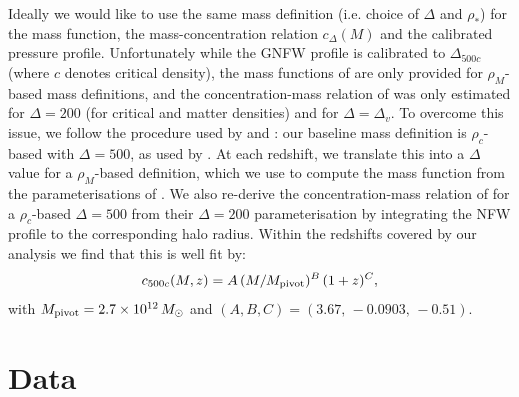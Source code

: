 \documentclass[useAMS,usenatbib]{mn2e}
\begin{document}
      Ideally we would like to use the same mass definition (i.e. choice of $\Delta$ and $\rho_*$) for the mass function, the mass-concentration relation $c_\Delta(M)$ and the calibrated pressure profile. Unfortunately while the GNFW profile is calibrated to $\Delta_{500c}$ (where $c$ denotes critical density), the mass functions of \cite{2008ApJ...688..709T,2010ApJ...724..878T} are only provided for $\rho_M$-based mass definitions, and the concentration-mass relation of \cite{2008MNRAS.390L..64D} was only estimated for $\Delta=200$ (for critical and matter densities) and for $\Delta=\Delta_v$. To overcome this issue, we follow the procedure used by \cite{2016A&A...594A..24P} and \cite{2018MNRAS.477.4957B}: our baseline mass definition is $\rho_c$-based with $\Delta=500$, as used by \cite{2010A&A...517A..92A}. At each redshift, we translate this into a $\Delta$ value for a $\rho_M$-based definition, which we use to compute the mass function from the parameterisations of \cite{2008ApJ...688..709T,2010ApJ...724..878T}. We also re-derive the concentration-mass relation of \cite{2008MNRAS.390L..64D} for a $\rho_c$-based $\Delta=500$ from their $\Delta=200$ parameterisation by integrating the NFW profile to the corresponding halo radius. Within the redshifts covered by our analysis we find that this is well fit by:
      \begin{equation}
        c_{500c}(M,z)= A\,(M/M_{\rm pivot})^B\,(1+z)^C,
      \end{equation}
      with $M_{\rm pivot}=2.7\times10^{12}\,M_\odot$ and $(A,B,C)=(3.67,\,-0.0903,\,-0.51)$.

\section{Data}\label{sec:data}
\end{document}
